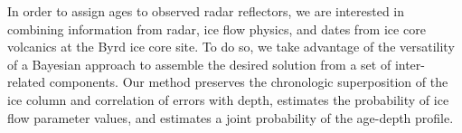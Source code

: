 


In order to assign ages to observed radar reflectors, we are interested in combining information from radar, ice flow physics, and dates from ice core volcanics at the Byrd ice core site. To do so, we take advantage of the versatility of a Bayesian approach to assemble the desired solution from a set of inter-related components.  Our method preserves the chronologic superposition of the ice column and correlation of errors with depth, estimates the probability of ice flow parameter values, and estimates a joint probability of the age-depth profile. 





